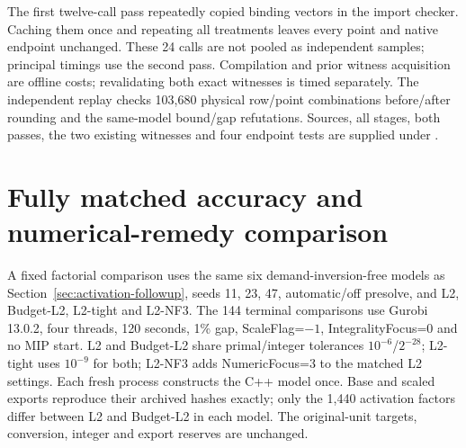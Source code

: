 \documentclass[11pt]{article}
\begin{document}
\begin{table}[tb]
\centering\small\setlength{\tabcolsep}{4pt}
\caption{Matched IF control and full prototype costs. Upper: budget and bound/gap
definitions follow Table~S11; Work is the median. Lower: median wall seconds.
Generate includes C++ launch, input, construction and Base writing; Select/export
covers factors and scaled writing; Import/check covers native setup and model equality.
Total includes the entire fresh process, also startup, reading, metadata, integrity,
extraction and persistence. Stages shown are not exhaustive; medians need not add.
Shared-machine timings describe this prototype and do not establish general performance.}
\label{tab:if1-workflow}

\par\medskip

\end{table}

The first twelve-call pass repeatedly copied binding vectors in
the import checker. Caching them once and repeating all treatments leaves every
point and native endpoint unchanged. These 24 calls are not pooled as independent
samples; principal timings use the second pass. Compilation and prior witness
acquisition are offline costs; revalidating both exact witnesses is timed separately.
The independent replay checks 103,680 physical row/point combinations before/after
rounding and the same-model bound/gap refutations. Sources, all stages, both passes,
the two existing witnesses and four endpoint tests are supplied under
.

\FloatBarrier
\section{Fully matched accuracy and numerical-remedy comparison}
\label{sec:si-matched-accuracy}
A fixed factorial comparison uses the same six demand-inversion-free models as
Section~\ref{sec:activation-followup}, seeds 11, 23, 47, automatic/off presolve,
and L2, Budget-L2, L2-tight and L2-NF3. The 144 terminal comparisons use Gurobi
13.0.2, four threads, 120 seconds, 1\% gap, ScaleFlag=$-1$,
IntegralityFocus=0 and no MIP start. L2 and Budget-L2 share primal/integer
tolerances $10^{-6}$/$2^{-28}$; L2-tight uses $10^{-9}$ for both; L2-NF3 adds
NumericFocus=3 to the matched L2 settings. Each fresh process constructs the C++
model once. Base and scaled exports reproduce their archived hashes exactly;
only the 1,440 activation factors differ between L2 and Budget-L2 in each model.
The original-unit targets, conversion, integer and export reserves are unchanged.
\end{document}
